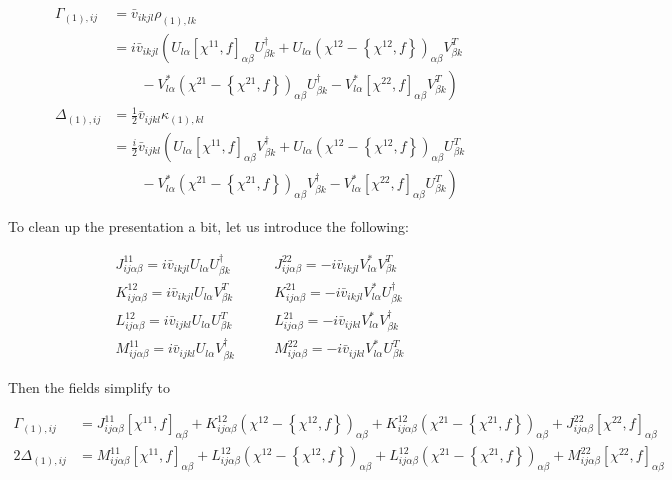\begin{align*}
\Gamma_{(1),ij} 
&= \bar{v}_{ikjl}\rho_{(1),lk} \\
&= i\bar{v}_{ikjl}\left(U_{l\alpha}[\chi^{11},f]_{\alpha\beta}U^\dagger_{\beta k} + U_{l\alpha}\left(\chi^{12}-\left\{\chi^{12},f\right\}\right)_{\alpha\beta}V^T_{\beta k}\right. \\
&\left.\qquad - V^*_{l\alpha}\left(\chi^{21}-\left\{\chi^{21},f\right\}\right)_{\alpha\beta}U^\dagger_{\beta k} - V^*_{l\alpha}[\chi^{22},f]_{\alpha\beta}V^T_{\beta k} \right) \\
\Delta_{(1),ij} 
&= \frac{1}{2}\bar{v}_{ijkl}\kappa_{(1),kl} \\
&= \frac{i}{2}\bar{v}_{ijkl}\left(U_{l\alpha}[\chi^{11},f]_{\alpha\beta}V^\dagger_{\beta k} + U_{l\alpha}\left(\chi^{12}-\left\{\chi^{12},f\right\}\right)_{\alpha\beta}U^T_{\beta k}\right. \\
&\left.\qquad - V^*_{l\alpha}\left(\chi^{21}-\left\{\chi^{21},f\right\}\right)_{\alpha\beta}V^\dagger_{\beta k} - V^*_{l\alpha}[\chi^{22},f]_{\alpha\beta}U^T_{\beta k} \right)
\end{align*}

To clean up the presentation a bit, let us introduce the following:

\begin{tcolorbox}
\begin{align*}
J^{11}_{ij\alpha\beta} = i\bar{v}_{ikjl}U_{l\alpha}U^\dagger_{\beta k} &\qquad J^{22}_{ij\alpha\beta} = -i\bar{v}_{ikjl}V^*_{l\alpha}V^T_{\beta k} \\
K^{12}_{ij\alpha\beta} = i\bar{v}_{ikjl}U_{l\alpha}V^T_{\beta k} &\qquad K^{21}_{ij\alpha\beta} = -i\bar{v}_{ikjl}V^*_{l\alpha}U^\dagger_{\beta k} \\
L^{12}_{ij\alpha\beta} = i\bar{v}_{ijkl}U_{l\alpha}U^T_{\beta k} &\qquad L^{21}_{ij\alpha\beta} = -i\bar{v}_{ijkl}V^*_{l\alpha}V^\dagger_{\beta k} \\
M^{11}_{ij\alpha\beta} = i\bar{v}_{ijkl}U_{l\alpha}V^\dagger_{\beta k} &\qquad M^{22}_{ij\alpha\beta} = -i\bar{v}_{ijkl}V^*_{l\alpha}U^T_{\beta k}
\end{align*}
\end{tcolorbox}

\noindent Then the fields simplify to

\begin{align*}
\Gamma_{(1),ij} &= J^{11}_{ij\alpha\beta}[\chi^{11},f]_{\alpha\beta} + K^{12}_{ij\alpha\beta}\left(\chi^{12}-\left\{\chi^{12},f\right\}\right)_{\alpha\beta} + K^{12}_{ij\alpha\beta}\left(\chi^{21}-\left\{\chi^{21},f\right\}\right)_{\alpha\beta} + J^{22}_{ij\alpha\beta}[\chi^{22},f]_{\alpha\beta} \\
2\Delta_{(1),ij}  &= M^{11}_{ij\alpha\beta}[\chi^{11},f]_{\alpha\beta} + L^{12}_{ij\alpha\beta}\left(\chi^{12}-\left\{\chi^{12},f\right\}\right)_{\alpha\beta} + L^{12}_{ij\alpha\beta}\left(\chi^{21}-\left\{\chi^{21},f\right\}\right)_{\alpha\beta} + M^{22}_{ij\alpha\beta}[\chi^{22},f]_{\alpha\beta} \\
\end{align*}


